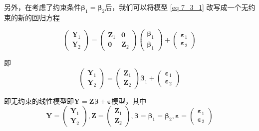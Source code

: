 
		
		另外，在考虑了约束条件$ \boldsymbol{\beta}_{1}=\boldsymbol{\beta}_{2} $后，我们可以将模型 \ref{eq 7_3_1} 改写成一个无约束的新的回归方程
		
		$$ \left(
				\begin{array}{l}
					\boldsymbol{Y}_{1} \\
					\boldsymbol{Y}_{2}
				\end{array}\right)		
			=\left(\begin{array}{cc}
				\boldsymbol{Z}_{1} & \boldsymbol{0} \\
				\boldsymbol{0} & \boldsymbol{Z}_{2}
			\end{array}\right)\left(\begin{array}{c}
				\boldsymbol{\beta}_{1} \\
				\boldsymbol{\beta}_{1}
			\end{array}\right)+\left(\begin{array}{c}
				\boldsymbol{\varepsilon}_{1} \\
				\boldsymbol{\varepsilon}_{2}
			\end{array} \right) $$

		即
		\begin{equation}
			\left(\begin{array}{c}
				\boldsymbol{Y}_{1} \\
				\boldsymbol{Y}_{2}
			\end{array}\right)=\left(\begin{array}{c}
				\boldsymbol{Z}_{1} \\
				\boldsymbol{Z}_{2}
			\end{array}\right) \boldsymbol{\beta}_{1}+\left(\begin{array}{c}
				\boldsymbol{\varepsilon}_{1} \\
				\boldsymbol{\varepsilon}_{2}
			\end{array}\right) 
			\label{eq 7_3_2}
		\end{equation}

		即无约束的线性模型即$ \boldsymbol{Y}=\boldsymbol{Z} \boldsymbol{\beta}+\boldsymbol{\varepsilon} $模型，其中
		$$ \boldsymbol{Y}=\left(\begin{array}{l}
			\boldsymbol{Y}_{1} \\
			\boldsymbol{Y}_{2}
		\end{array}\right),
		\boldsymbol{Z}=\left(\begin{array}{cc}
			\boldsymbol{Z}_{1}  \\
			\boldsymbol{Z}_{2}
		\end{array}\right),
		\boldsymbol{\beta} = \boldsymbol{\beta}_{1} = \boldsymbol{\beta}_{2},
		\boldsymbol{\varepsilon}=\left(\begin{array}{c}
			\boldsymbol{\varepsilon}_{1} \\
			\boldsymbol{\varepsilon}_{2}
		\end{array}\right) $$
		
